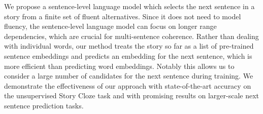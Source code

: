 We propose a sentence-level language model which selects the next sentence in a story from a finite set of fluent alternatives. Since it does not need to model fluency, the sentence-level language model can focus on longer range dependencies, which are crucial for multi-sentence coherence. Rather than dealing with individual words, our method treats the story so far as a list of pre-trained sentence embeddings and predicts an embedding for the next sentence, which is more efficient than predicting word embeddings. Notably this allows us to consider a large number of candidates for the next sentence during training. We demonstrate the effectiveness of our approach with state-of-the-art accuracy on the unsupervised Story Cloze task and with promising results on larger-scale next sentence prediction tasks.
